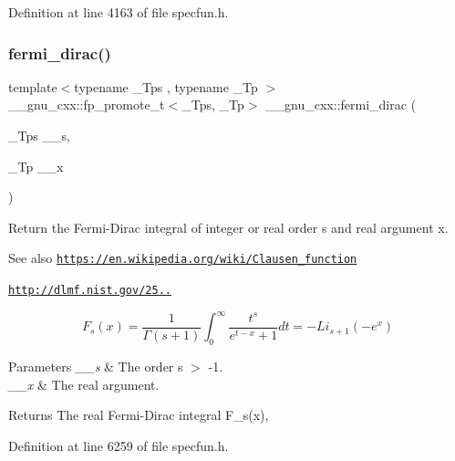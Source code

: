Definition at line 4163 of file specfun.\+h.

\mbox{\label{group__mathsf__gnu_ga5468fbaed5cb8384cff7cfb9d2188d1a}} 
\subsubsection{\texorpdfstring{fermi\+\_\+dirac()}{fermi\_dirac()}}
{\footnotesize\ttfamily template$<$typename \+\_\+\+Tps , typename \+\_\+\+Tp $>$ \\
\+\_\+\+\_\+gnu\+\_\+cxx\+::fp\+\_\+promote\+\_\+t$<$\+\_\+\+Tps, \+\_\+\+Tp$>$ \+\_\+\+\_\+gnu\+\_\+cxx\+::fermi\+\_\+dirac (\begin{DoxyParamCaption}\item[{\+\_\+\+Tps}]{\+\_\+\+\_\+s,  }\item[{\+\_\+\+Tp}]{\+\_\+\+\_\+x }\end{DoxyParamCaption})\hspace{0.3cm}{\ttfamily [inline]}}

Return the Fermi-\/\+Dirac integral of integer or real order s and real argument x. \begin{DoxySeeAlso}{See also}
\href{https://en.wikipedia.org/wiki/Clausen_function}{\tt https\+://en.\+wikipedia.\+org/wiki/\+Clausen\+\_\+function} 

\href{http://dlmf.nist.gov/25.12.16}{\tt http\+://dlmf.\+nist.\+gov/25..}
\end{DoxySeeAlso}
\[ F_s(x) = \frac{1}{\Gamma(s+1)}\int_0^\infty \frac{t^s}{e^{t-x} + 1}dt = -Li_{s+1}(-e^x) \]


\begin{DoxyParams}{Parameters}
{\em \+\_\+\+\_\+s} & The order s $>$ -\/1. \\
\hline
{\em \+\_\+\+\_\+x} & The real argument. \\
\hline
\end{DoxyParams}
\begin{DoxyReturn}{Returns}
The real Fermi-\/\+Dirac integral F\+\_\+s(x), 
\end{DoxyReturn}


Definition at line 6259 of file specfun.\+h.

\mbox{\label{group__mathsf__gnu_gacf7f49b2b7bf50fd37d939236712cbe2}} 
